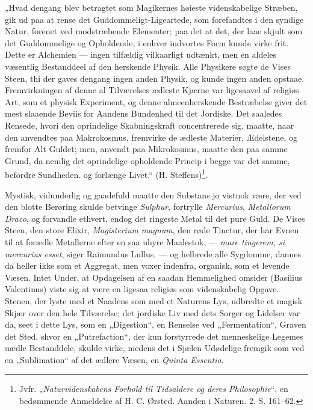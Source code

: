 \documentclass[12pt,a4paper]{book}
\begin{document}
„Hvad dengang blev betragtet som Magikernes høieste
videnskabelige Stræben, gik ud paa at rense det
\setcounter{footnote}{0}
Guddommeligt-Ligeartede, som forefandtes i den syndige Natur, forenet ved
modstræbende Elementer; paa det at det, der laae skjult som
det Guddommelige og Opholdende, i enhver indvortes Form
kunde virke frit. Dette er Alchemien --- ingen tilfældig
vilkaarligt udtænkt, men en aldeles væsentlig Bestanddeel af den
herskende Physik. Alle Physikere søgte de Vises Steen, thi
der gaves dengang ingen anden Physik, og kunde ingen anden
opstaae. Fremvirkningen af denne al Tilværelses ædleste
Kjærne var ligesaavel af religiøs Art, som et physisk Experiment,
og denne almeenherskende Bestræbelse giver det mest
slaaende Beviis for Aandens Bundenhed til det Jordiske.
Det saaledes Rensede, hvori den oprindelige Skabningskraft
concentrerede sig, maatte, naar den anvendtes paa Makrokosmus,
fremvirke de ædleste Materier, Ædelstene, og fremfor
Alt Guldet; men, anvendt paa Mikrokosmus, maatte den paa
samme Grund, da nemlig det oprindelige opholdende Princip
i begge var det samme, befordre Sundheden. og forlænge Livet.“
(H. Steffens)\footnote{Jvfr. „\emph{Naturvidenskabens Forhold
til Tidsaldere og deres Philosophie}“, en bedømmende Anmeldelse
af H. C. Ørsted. Aanden i Naturen. 2. S. 161--62.}.

Mystisk, vidunderlig og gaadefuld maatte den Substans
jo vistnok være, der ved den blotte Berøring skulde betvinge
\textit{Sulphur}, fortrylle \textit{Mercurius}, \textit{Metallorum
Draco}, og forvandle
ethvert, endog det ringeste Metal til det pure Guld.
De Vises Steen, den store Elixir, \textit{Magisterium magnum},
den røde Tinctur, der har Evnen til at forædle Metallerne
efter en saa uhyre Maalestok, --- \textit{mare tingerem, si
mercurius esset}, siger Raimundus Lullus, --- og helbrede alle
Sygdomme, dannes da heller ikke som et Aggregat, men voxer
indenfra, organisk, som et levende Væsen. Intet Under, at
Opdagelsen af en saadan Hemmelighed omsider (Basilius
Valentinus) viste sig at være en ligesaa religiøs som videnskabelig
Opgave. Stenen, der lyste med et Naadens som med et
Naturens Lys, udbredte et magisk Skjær over den hele
Tilværelse; det jordiske Liv med dets Sorger og Lidelser var da,
seet i dette Lys, som en „Digestion“, en Renselse ved
„Fermentation“, Graven det Sted, shvor en „Putrefaction“, der
kun forstyrrede det menneskelige Legemes uædle Bestanddele,
skulde virke, medens det i Sjælen Udødelige fremgik som ved en
„Sublimation“ af det ædlere Væsen, en \textit{Quinta Essentia}.
\end{document}
